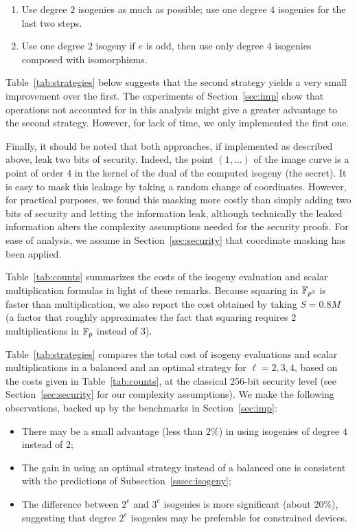 \begin{enumerate}
\item Use degree $2$ isogenies as much as possible; use one degree $4$
  isogenies for the last two steps.
\item Use one degree $2$ isogeny if $e$ is odd, then use only degree
  $4$ isogenies composed with isomorphisms.
\end{enumerate}

Table~\ref{tab:strategies} below suggests that the second strategy
yields a very small improvement over the first. The experiments of
Section~\ref{sec:imp} show that operations not accounted for in this
analysis might give a greater advantage to the second
strategy. However, for lack of time, we only implemented the first
one.

Finally, it should be noted that both approaches, if implemented as
described above, leak two bits of security. Indeed, the point
$(1,\ldots)$ of the image curve is a point of order $4$ in the kernel
of the dual of the computed isogeny (the secret). It is easy to mask
this leakage by taking a random change of coordinates. However, for
practical purposes, we found this masking more costly than simply adding
two bits of security and letting the information leak, although
technically the
leaked information alters the complexity assumptions needed for the
security proofs. For ease of analysis, we assume in
Section~\ref{sec:security} that coordinate masking has been applied.

Table~\ref{tab:counts} summarizes the costs of the isogeny evaluation
and scalar multiplication formulas in light of these remarks. Because
squaring in ${\mathbb{F}}_{p^2}$ is faster than multiplication, we also report
the cost obtained by taking $S=0.8M$ (a factor that roughly
approximates the fact that squaring requires $2$ multiplications in
${\mathbb{F}}_p$ instead of $3$).

Table~\ref{tab:strategies} compares the total cost of isogeny
evaluations and scalar multiplications in a balanced and an optimal
strategy for $\ell=2,3,4$, based on the costs given in
Table~\ref{tab:counts}, at the classical 256-bit security level (see
Section~\ref{sec:security} for our complexity assumptions). We make the following observations, backed up by the benchmarks in Section~\ref{sec:imp}:
\begin{itemize}
\item There may be a small advantage (less than $2\%$) in using
  isogenies of degree $4$ instead of $2$;
\item The gain in using an optimal strategy instead of a balanced one
  is consistent with the predictions of
  Subsection~\ref{sssec:isogeny};
\item The difference between $2^e$ and $3^e$ isogenies is more
  significant (about $20\%$), suggesting that degree $2^e$ isogenies
  may be preferable for constrained devices.
\end{itemize}

